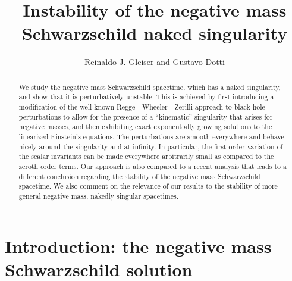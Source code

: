 \documentclass[12pt,aps,floats,showpacs,amssymb,tightenlines]{revtex4}
\begin{document}
\title{Instability of the negative mass Schwarzschild naked singularity}
\author{Reinaldo J. Gleiser and Gustavo Dotti}


\begin{abstract}
We study the negative mass  Schwarzschild spacetime, which has a
naked singularity, and show that it is perturbatively unstable. This
is achieved by first introducing a modification of the well known Regge - Wheeler - Zerilli approach to black hole perturbations to allow for the presence of a ``kinematic'' singularity that arises for negative masses, and then exhibiting exact exponentially growing  solutions to the
linearized Einstein's equations. The perturbations are smooth everywhere and behave nicely around the
singularity and at infinity. In particular, the first order variation of the
scalar invariants can be made everywhere arbitrarily small as compared to the zeroth order terms.
Our approach is also compared to a recent analysis that leads to a different conclusion regarding the stability of the negative mass  Schwarzschild spacetime. We also comment on the relevance of our results to the stability of more general negative mass, nakedly singular spacetimes.
\end{abstract}


\maketitle




\noindent
\section{Introduction: the negative mass Schwarzschild solution}
\end{document}
